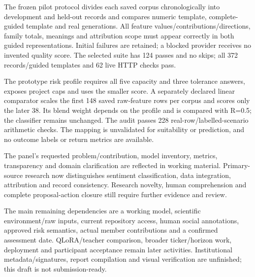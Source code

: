 The frozen pilot protocol divides each saved corpus chronologically into development and held-out records and compares numeric template, complete-guided template and real generations. All feature values/contributions/directions, family totals, meanings and attribution scope must appear correctly in both guided representations. Initial failures are retained; a blocked provider receives no invented quality score. The selected suite has 124 passes and no skips; all 372 records/guided templates and 62 live HTTP checks pass.

The prototype risk profile requires all five capacity and three tolerance answers, exposes project caps and uses the smaller score. A separately declared linear comparator scales the first 148 saved raw-feature rows per corpus and scores only the later 38. Its blend weight depends on the profile and is compared with R=0.5; the classifier remains unchanged. The audit passes 228 real-row/labelled-scenario arithmetic checks. The mapping is unvalidated for suitability or prediction, and no outcome labels or return metrics are available.

The panel's requested problem/contribution, model inventory, metrics, transparency and domain clarification are reflected in working material. Primary-source research now distinguishes sentiment classification, data integration, attribution and record consistency. Research novelty, human comprehension and complete proposal-action closure still require further evidence and review.

The main remaining dependencies are a working model, scientific environment/raw inputs, current repository access, human social annotations, approved risk semantics, actual member contributions and a confirmed assessment date. QLoRA/teacher comparison, broader ticker/horizon work, deployment and participant acceptance remain later activities. Institutional metadata/signatures, report compilation and visual verification are unfinished; this draft is not submission-ready.
